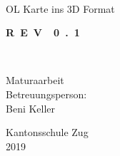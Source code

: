 \begin{titlepage}

  
  \begin{center}
  
    \vspace{40mm}
    
    \huge{\textbf{\mytitle\\}}
    \huge{OL Karte ins 3D Format\\}
    
    \vspace{20mm}
    
    \color{red}
    \huge{\textbf{R~E~V~~0~.~1\\}}
    \color{black}
    
    \vspace{20mm}
    
    \Large{\textbf{\myauthor\\}}
    \mydate
    
    \vspace{15mm}
    
    Maturaarbeit\\
    Betreuungsperson:\\ 
    Beni Keller
    
    \vspace{15mm}
      
    Kantonsschule Zug\\
    2019
    
    
  \end{center}

\end{titlepage}